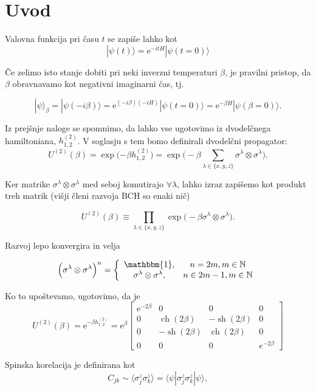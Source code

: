 \documentclass[12pt, a4 paper]{article}
\newcommand{\e}{
	\ensuremath{\mathrm{e}}
}
\newcommand{\ch}{
	\operatorname{ch}
}
\newcommand{\sh}{
	\operatorname{sh}
}
\begin{document}
\section{Uvod}

Valovna funkcija pri \v casu $t$ se zapi\v se lahko kot
\[
	|\psi(t)\rangle = \e^{-itH} |\psi(t = 0)\rangle
\]

\v Ce zelimo isto stanje dobiti pri neki inverzni temperaturi $\beta$, je pravilni pristop, da $\beta$ obravnavamo
kot negativni imaginarni \v cas, tj.

\[
	|\psi\rangle_{\beta} = |\psi(-i\beta)\rangle = \e^{(-i\beta)(-i H)}|\psi(t = 0)\rangle = \e^{-\beta H}
		|\psi(\beta=0)\rangle.
\]

Iz prej\v snje naloge se spomnimo, da lahko vse ugotovimo iz dvodel\v cnega hamiltoniana, $h^{(2)}_{1,2}$. V soglasju s tem
bomo definirali dvodel\v cni propagator:
\[
	U^{(2)}(\beta) = \exp\Big({-\beta h^{(2)}_{1,2}}\Big) = \exp\bigg(-\beta\sum_{\lambda \in \{x,y,z\}}\sigma^\lambda
		\otimes \sigma^\lambda\bigg).
\]

Ker matrike $\sigma^\lambda \otimes \sigma^\lambda$ med seboj komutirajo $\forall \lambda$, lahko izraz zapi\v semo kot
produkt treh matrik (vi\v sji \v cleni razvoja BCH so enaki ni\v c)

\begin{equation}
	U^{(2)}(\beta) \equiv \prod_{\lambda \in \{x,y,z\}} \exp\big(-\beta \sigma^\lambda \otimes \sigma^\lambda\big).
\end{equation}

Razvoj lepo konvergira in velja

\[
	\Big(\sigma^\lambda \otimes \sigma^\lambda\Big)^n = \left\{
		\begin{array}{cc}
			\mathbbm{1}, & n = 2m, m \in \mathbb{N} \\
			\sigma^\lambda \otimes \sigma^\lambda, & n \in 2m - 1, m \in \mathbb{N}
		\end{array}
	\right.
\]

Ko to upo\v stevamo, ugotovimo, da je
\[
	U^{(2)}(\beta) = \e^{-\beta h^{(2)}_{1,2}} = \e^{\beta}\begin{bmatrix}
		\e^{-2\beta} & 0 & 0 & 0\\
		0 & \ch(2\beta) & -\sh(2\beta) & 0 \\
		0 & -\sh(2\beta) & \ch(2\beta) & 0 \\
		0 & 0 & 0 & e^{-2\beta}
	\end{bmatrix}
\]

Spinska korelacija je definirana kot
\[
	C_{jk} \sim \langle \sigma_j^z \sigma_k^z \rangle = \langle \psi| \sigma_j^z \sigma_k^z |\psi \rangle,
\]
\end{document}
